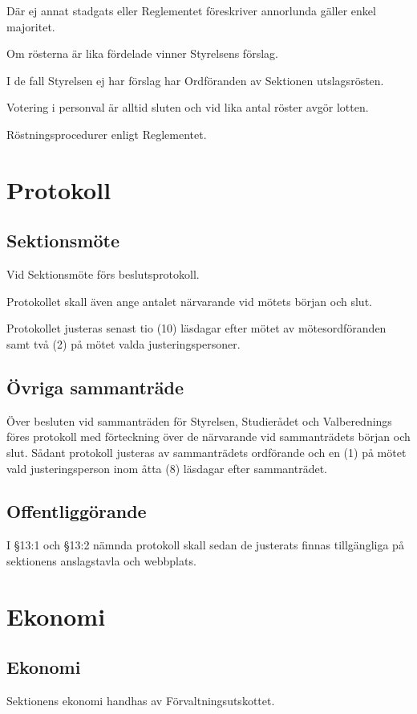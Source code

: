 \documentclass[10pt]{article}
\begin{document}
    Där ej annat stadgats eller Reglementet föreskriver annorlunda gäller enkel
    majoritet.
    
    Om rösterna är lika fördelade vinner Styrelsens förslag.
    
    I de fall Styrelsen ej har förslag har Ordföranden av Sektionen utslagsrösten.
    
    Votering i personval är alltid sluten och vid lika antal röster avgör lotten.
    
    Röstningsprocedurer enligt Reglementet.
    \newpage
    
    \section{Protokoll}
    \subsection{Sektionsmöte}
    Vid Sektionsmöte förs beslutsprotokoll.
    
    Protokollet skall även ange antalet närvarande vid mötets början och slut.
    
    Protokollet justeras senast tio (10) läsdagar efter mötet av
    mötesordföranden samt två (2) på mötet valda justeringspersoner.
    
    \subsection{Övriga sammanträde}
    Över besluten vid sammanträden för Styrelsen, Studierådet och
    Valberednings föres protokoll med förteckning över de närvarande vid
    sammanträdets början och slut.
    Sådant protokoll justeras av sammanträdets ordförande och en (1) på mötet
    vald justeringsperson inom åtta (8) läsdagar efter sammanträdet.
    
    \subsection{Offentliggörande}
    I §13:1 och §13:2 nämnda protokoll skall sedan de justerats finnas
    tillgängliga på sektionens anslagstavla och webbplats.
    \newpage
    
    \section{Ekonomi}
    \subsection{Ekonomi}
    Sektionens ekonomi handhas av Förvaltningsutskottet.
    
\end{document}
